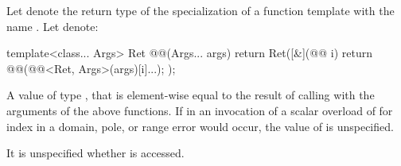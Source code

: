 \begin{itemdescr}
\pnum
Let  denote the return type of the specialization of a function
template with the name .
Let  denote:
\begin{codeblock}
template<class... Args>
Ret @@(Args... args) {
  return Ret([&](@@ i) {
    return @@(@@<Ret, Args>(args)[i]...);
  });
}
\end{codeblock}

\pnum
\returns
A value  of type , that is element-wise equal to the
result of calling  with the arguments of the above
functions.
If in an invocation of a scalar overload of  for index
 in  a domain, pole, or range error would
occur, the value of  is unspecified.

\pnum
\remarks
It is unspecified whether  is accessed.
\end{itemdescr}

